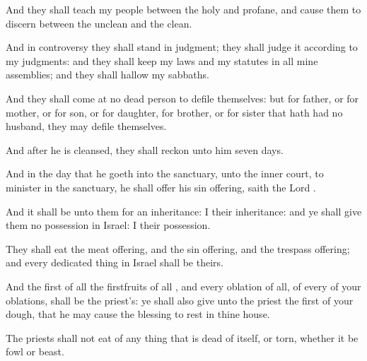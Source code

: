 {And they shall
teach my
people
{} between the
holy and
profane, and cause them to
discern between the
unclean and the
clean.

And in
controversy they shall
stand in
judgment;
{} they shall
judge it according to my
judgments: and they shall
keep my
laws and my
statutes in all mine
assemblies; and they shall
hallow my
sabbaths.

And they shall
come at no
dead
person to
defile themselves: but for
father, or for
mother, or for
son, or for
daughter, for
brother, or for
sister that hath had no
husband, they may
defile themselves.

And
after he is
cleansed, they shall
reckon unto him
seven
days.

And in the
day that he
goeth into the
sanctuary, unto the
inner
court, to
minister in the
sanctuary, he shall
offer his sin
offering,
saith the
Lord
{}.

And it shall be unto them for an
inheritance: I
{} their
inheritance: and ye shall
give them no
possession in
Israel: I
{} their
possession.

They shall
eat the meat
offering, and the sin
offering, and the trespass
offering; and every dedicated
thing in
Israel shall be theirs.

And the
first of all the
firstfruits of all
{}, and every
oblation of all, of every
{} of your
oblations, shall be the
priest’s: ye shall also
give unto the
priest the
first of your
dough, that he may cause the
blessing to
rest in thine
house.

The
priests shall not
eat of any thing that is dead of
itself, or
torn, whether it be
fowl or
beast.




\par }
